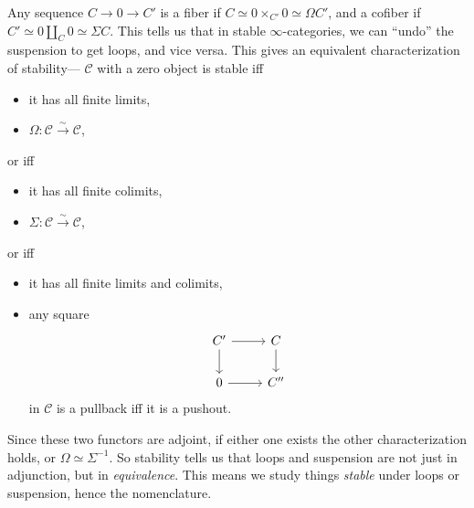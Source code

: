 \begin{example}
    Any sequence $C \to 0 \to C'$ is a fiber if $C \simeq 0 \times_{C'}0\simeq \Omega C' $, and a cofiber if $C'\simeq 0 \amalg_C 0\simeq \Sigma C$. This tells us that in stable $\infty$-categories, we can ``undo'' the suspension to get loops, and vice versa. This gives an equivalent characterization of stability--- $\mathcal{C} $ with a zero object is stable iff 
\begin{itemize}
\setlength\itemsep{-.2em}
    \item it has all finite limits,
    \item $\Omega \colon \mathcal{C} \overset{\sim}{\to} \mathcal{C}  $,
\end{itemize}or iff
\begin{itemize}
\setlength\itemsep{-.2em}
    \item it has all finite colimits,
    \item $\Sigma\colon \mathcal{C} \overset{\sim}{\to} \mathcal{C}  $,
\end{itemize}or iff
\begin{itemize}
\setlength\itemsep{-.2em}
    \item it has all finite limits and colimits,
    \item any square \[
    \begin{tikzcd}
        C'\arrow[r]\arrow[d]& C\arrow[d]\\
        0\arrow[r]& C''
    \end{tikzcd}
    \] in $\mathcal{C} $ is a pullback iff it is a pushout.
\end{itemize}
Since these two functors are adjoint, if either one exists the other characterization holds, or $\Omega\simeq \Sigma ^{-1}$. So stability tells us that loops and suspension are not just in adjunction, but in \emph{equivalence}. This means we study things \emph{stable} under loops or suspension, hence the nomenclature.
\end{example}

